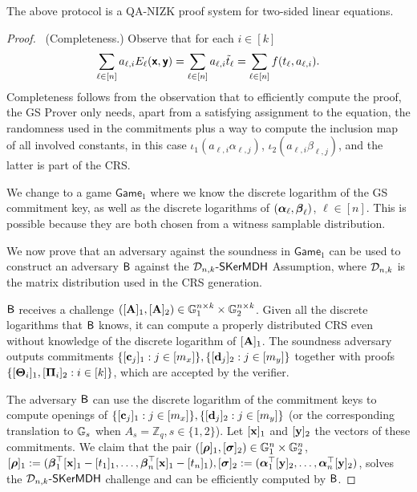 \begin{theorem}
The above protocol is a QA-NIZK proof system for two-sided linear equations.
\end{theorem}  
\begin{proof}\ 
(Completeness.)  Observe that for each $i\in[k]$
\begin{equation}
\sum_{\ell\in[n]} a_{\ell,i} E_{\ell}(\textbf{\textsf{x}},\textbf{\textsf{y}})= \sum_{\ell\in[n]} a_{\ell,i}\tilde{t}_\ell=\sum_{\ell\in[n]}f(t_\ell,a_{\ell,i}).
\end{equation}  Completeness follows 
from the observation that to efficiently compute the proof, the GS Prover only needs, apart from a satisfying assignment to the equation, the randomness used in the commitments plus a way to compute the inclusion map of all involved constants, in this case $\iota_1(a_{\ell,i} \alpha_{\ell,j})$,
$\iota_2(a_{\ell,i} \beta_{\ell,j})$, and the latter is part of the CRS.
 
 We change to a game $\mathsf{Game}_{1}$ where we know the discrete logarithm of the GS commitment key, as well as the discrete logarithms of $({\boldsymbol \alpha}_{\ell},{\boldsymbol \beta}_{\ell})$, $\ell \in [n]$. This is possible because they are both chosen from a witness samplable distribution.

We now prove that an adversary against the soundness in $\mathsf{Game}_{1}$ can be used to construct an adversary $\mathsf{B}$ against the 
$\mathcal{D}_{n,k}\mbox{-}\mathsf{SKerMDH}$ Assumption, where 
$\mathcal{D}_{n,k}$ is the matrix distribution used in the CRS generation. 

$\mathsf{B}$ receives a challenge $([\mathbf{{A}}]_1,[\mathbf{{A}}]_2)\in\mathbb{G}_1^{n\times k}\times\mathbb{G}_2^{n\times k}$. Given all the discrete logarithms that $\mathsf{B}$ knows, it can compute a properly distributed CRS even without knowledge of the discrete logarithm of $[\mathbf{{A}}]_1$. The  soundness adversary outputs commitments $\{[\mathbf{c}_j]_1:j\in[m_x]\},\{[\mathbf{d}_{j}]_2:j\in[m_y]\}$ together with proofs $\{[\mathbf{{\Theta}}_{i}]_1,[\mathbf{{\Pi}}_{i}]_2:i \in [k]\}$, which are accepted by the verifier.

The adversary $\mathsf{B}$ can use the discrete logarithm of the commitment keys to compute openings of $\{[\mathbf{c}_j]_1:j\in[m_x]\},\{[\mathbf{d}_j]_2:j\in[m_y]\}$ (or the corresponding translation to $\mathbb{G}_s$ when $A_s=\mathbb{Z}_q, s\in\{1,2\}$). Let $[\mathbf{x}]_1$ and $[\mathbf{y}]_2$ the vectors of these commitments.
We claim that the pair  $([{\boldsymbol \rho}]_1,[{\boldsymbol \sigma}]_2) \in \mathbb{G}_1^{n} \times \mathbb{G}_2^n$, 
$[{\boldsymbol \rho}]_1:=({\boldsymbol \beta}_1^\top[\mathbf{x}]_1 -[t_1]_1,\ldots,
{\boldsymbol \beta}_{n}^\top[\mathbf{x}]_1 -[t_{n}]_1),  
[{\boldsymbol \sigma}]_2:=({\boldsymbol \alpha}_1^\top[\mathbf{y}]_2,\ldots,
{\boldsymbol \alpha}_{n}^\top[\mathbf{y}]_2)$, solves the  $\mathcal{D}_{n,k}\mbox{-}\mathsf{SKerMDH}$ challenge and can be efficiently computed by $\mathsf{B}$. 


\end{proof}
